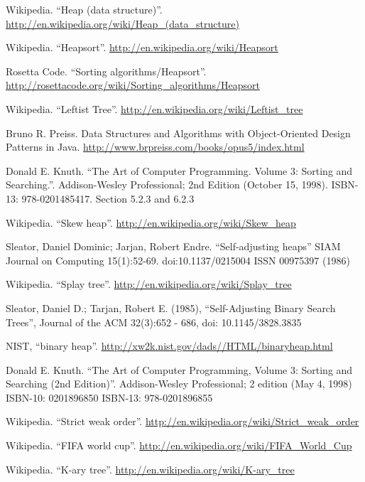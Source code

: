 \documentclass[b5paper]{ctexart}
\begin{document}
\begin{thebibliography}{99}
Wikipedia. ``Heap (data structure)''. \url{http://en.wikipedia.org/wiki/Heap_(data_structure)}

Wikipedia. ``Heapsort''. \url{http://en.wikipedia.org/wiki/Heapsort}

Rosetta Code. ``Sorting algorithms/Heapsort''.  \url{http://rosettacode.org/wiki/Sorting_algorithms/Heapsort}

Wikipedia. ``Leftist Tree''. \url{http://en.wikipedia.org/wiki/Leftist_tree}

Bruno R. Preiss. Data Structures and Algorithms with Object-Oriented Design Patterns in Java. \url{http://www.brpreiss.com/books/opus5/index.html}

Donald E. Knuth. ``The Art of Computer Programming. Volume 3: Sorting and Searching.''. Addison-Wesley Professional;
2nd Edition (October 15, 1998). ISBN-13: 978-0201485417. Section 5.2.3 and 6.2.3

Wikipedia. ``Skew heap''. \url{http://en.wikipedia.org/wiki/Skew_heap}

Sleator, Daniel Dominic; Jarjan, Robert Endre. ``Self-adjusting heaps'' SIAM Journal on Computing 15(1):52-69. doi:10.1137/0215004 ISSN 00975397 (1986)

Wikipedia. ``Splay tree''. \url{http://en.wikipedia.org/wiki/Splay_tree}

Sleator, Daniel D.; Tarjan, Robert E. (1985), ``Self-Adjusting Binary Search Trees'', Journal of the ACM 32(3):652 - 686, doi: 10.1145/3828.3835

NIST, ``binary heap''. \url{http://xw2k.nist.gov/dads//HTML/binaryheap.html}

Donald E. Knuth. ``The Art of Computer Programming, Volume 3: Sorting and Searching (2nd Edition)''. Addison-Wesley Professional; 2 edition (May 4, 1998) ISBN-10: 0201896850 ISBN-13: 978-0201896855

Wikipedia. ``Strict weak order''. \url{http://en.wikipedia.org/wiki/Strict_weak_order}

Wikipedia. ``FIFA world cup''. \url{http://en.wikipedia.org/wiki/FIFA_World_Cup}

Wikipedia. ``K-ary tree''. \url{http://en.wikipedia.org/wiki/K-ary_tree}


\end{thebibliography}
\end{document}
